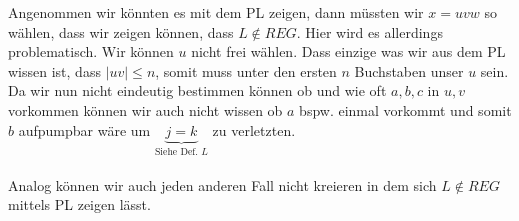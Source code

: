 Angenommen wir könnten es mit dem PL zeigen, dann müssten wir $x=uvw$ so wählen, dass wir zeigen können, dass $L\notin REG$. Hier wird es allerdings problematisch. Wir können $u$ nicht frei wählen. Dass einzige was wir aus dem PL wissen ist, dass $\mid uv\mid\le n$, somit muss unter den ersten $n$ Buchstaben unser $u$ sein. Da wir nun nicht eindeutig bestimmen können ob und wie oft $a,b,c$ in $u,v$ vorkommen können wir auch nicht wissen ob $a$ bspw. einmal vorkommt und somit $b$ aufpumpbar wäre um $\underbrace{j=k}_{\text{Siehe Def. $L$}}$ zu verletzten.\\\\Analog können wir auch jeden anderen Fall nicht kreieren in dem sich $L\notin REG$ mittels PL zeigen lässt.